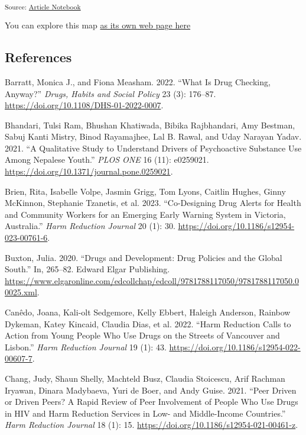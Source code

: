 \documentclass[
  letterpaper,
  DIV=11,
  numbers=noendperiod]{scrartcl}
\newlength{\cslhangindent}
\newenvironment{CSLReferences}[2] %
 {\begin{list}{}{%
  \setlength{\itemindent}{0pt}
  \setlength{\leftmargin}{0pt}
  \setlength{\parsep}{0pt}
  \ifodd #1
   \setlength{\leftmargin}{\cslhangindent}
   \setlength{\itemindent}{-1\cslhangindent}
  \fi
  \setlength{\itemsep}{#2\baselineskip}}}
 {\end{list}}
\begin{document}
\textsubscript{Source:
\href{https://mx-jx.github.io/YPWUD/index-preview.html}{Article
Notebook}}

You can explore this map \href{map.html}{as its own web page here}

\pagebreak

\subsection{References}\label{references}

\singlespacing

\pagebreak

\label{refs}
\begin{CSLReferences}{1}{0}
Barratt, Monica J., and Fiona Measham. 2022. {``What Is Drug Checking,
Anyway?''} \emph{Drugs, Habits and Social Policy} 23 (3): 176--87.
\url{https://doi.org/10.1108/DHS-01-2022-0007}.

Bhandari, Tulsi Ram, Bhushan Khatiwada, Bibika Rajbhandari, Amy Bestman,
Sabuj Kanti Mistry, Binod Rayamajhee, Lal B. Rawal, and Uday Narayan
Yadav. 2021. {``A Qualitative Study to Understand Drivers of
Psychoactive Substance Use Among Nepalese Youth.''} \emph{PLOS ONE} 16
(11): e0259021. \url{https://doi.org/10.1371/journal.pone.0259021}.

Brien, Rita, Isabelle Volpe, Jasmin Grigg, Tom Lyons, Caitlin Hughes,
Ginny McKinnon, Stephanie Tzanetis, et al. 2023. {``Co-Designing Drug
Alerts for Health and Community Workers for an Emerging Early Warning
System in Victoria, Australia.''} \emph{Harm Reduction Journal} 20 (1):
30. \url{https://doi.org/10.1186/s12954-023-00761-6}.

Buxton, Julia. 2020. {``Drugs and Development: Drug Policies and the
Global South.''} In, 265--82. Edward Elgar Publishing.
\url{https://www.elgaronline.com/edcollchap/edcoll/9781788117050/9781788117050.00025.xml}.

Canêdo, Joana, Kali-olt Sedgemore, Kelly Ebbert, Haleigh Anderson,
Rainbow Dykeman, Katey Kincaid, Claudia Dias, et al. 2022. {``Harm
Reduction Calls to Action from Young People Who Use Drugs on the Streets
of Vancouver and Lisbon.''} \emph{Harm Reduction Journal} 19 (1): 43.
\url{https://doi.org/10.1186/s12954-022-00607-7}.

Chang, Judy, Shaun Shelly, Machteld Busz, Claudia Stoicescu, Arif
Rachman Iryawan, Dinara Madybaeva, Yuri de Boer, and Andy Guise. 2021.
{``Peer Driven or Driven Peers? A Rapid Review of Peer Involvement of
People Who Use Drugs in HIV and Harm Reduction Services in Low- and
Middle-Income Countries.''} \emph{Harm Reduction Journal} 18 (1): 15.
\url{https://doi.org/10.1186/s12954-021-00461-z}.


\end{CSLReferences}
\end{document}
